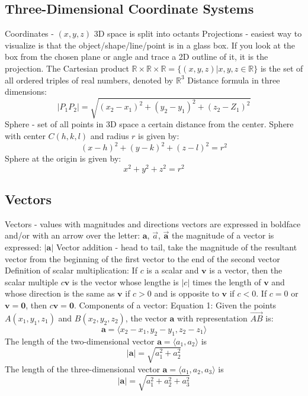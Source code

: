 \documentclass{article}
\begin{document}
    \subsection{Three-Dimensional Coordinate Systems} %
    \begin{outline}
        \1 Coordinates - \((x,y,z)\)
        \1 3D space is split into octants
        \1 Projections - easiest way to visualize is that the object/shape/line/point is in a glass box. If you look at the box from the chosen plane or angle and trace a 2D outline of it, it is the projection. 
        \1 The Cartesian product \(\mathbb{R}\times\mathbb{R}\times\mathbb{R}=\{(x,y,z)|x,y,z\in\mathbb{R}\}\) is the set of all ordered triples of real numbers, denoted by \(\mathbb{R}^3\)
        \1 Distance formula in three dimensions: \[|P_1P_2|=\sqrt{(x_2-x_1)^2+(y_2-y_1)^2+(z_2-Z_1)^2}\]
        \1 Sphere - set of all points in 3D space a certain distance from the center. 
            \2 Sphere with center \(C(h,k,l)\) and radius $r$ is given by: \[(x-h)^2+(y-k)^2+(z-l)^2=r^2\]
            \2 Sphere at the origin is given by: \[x^2+y^2+z^2=r^2\]
        
    \end{outline}
    \begin{multicols}{2}
    \subsection{Vectors}
    \begin{outline}
        \1 Vectors - values with magnitudes and directions
        \1 vectors are expressed in boldface and/or with an arrow over the letter: \(\mathbf{a}\), \(\vec{a}\), \(\vec{\mathbf{a}}\)
        \1 the magnitude of a vector is expressed: \(|\mathbf{a}|\)
        \1 Vector addition - head to tail, take the magnitude of the resultant vector from the beginning of the first vector to the end of the second vector 
        \1 Definition of scalar multiplication: If $c$ is a scalar and $\mathbf{v}$ is a vector, then the scalar multiple \(c\mathbf v\) is the vector whose lengthe is \(|c|\) times the length of \(\mathbf v\) and whose direction is the same as \(\mathbf v\) if \(c>0\) and is opposite to \(\mathbf v\) if \(c<0\). If \(c=0\) or \(\mathbf{v=0}\), then \(c\mathbf{v=0}\). 
        \1 Components of a vector: Equation 1: Given the points \(A(x_1,y_1,z_1)\) and \(B(x_2,y_2,z_2)\), the vector \(\mathbf a\) with representation \(\vec{AB}\) is: \[\mathbf a=\langle x_2-x_1, y_2-y_1,z_2-z_1\rangle\]
        \1 The length of the two-dimensional vector \(\mathbf a=\langle a_1,a_2\rangle\) is \[|\mathbf a|=\sqrt{a^2_1+a_2^2}\]
        \1 The length of the three-dimensional vector \(\mathbf a=\langle a_1,a_2,a_3\rangle\) is \[|\mathbf a|=\sqrt{a^2_1+a_2^2+a_3^2}\]
    \end{outline}\end{multicols}
\end{document}
